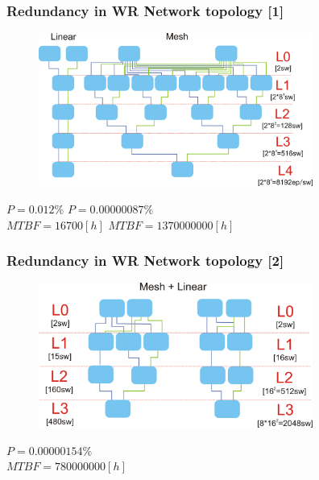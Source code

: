 \documentclass[]{beamer}
\begin{document}
\begin{frame}
  \frametitle{Redundancy in WR Network topology [1]}


\begin{figure}[tbp] %
  \centering
  \includegraphics[width=9cm,keepaspectratio]{network/network_topology_0.png}

\end{figure}

$P=0.012\%$  \hspace{4cm}   $P=0.00000087\%$  \\   
$MTBF=16700[h]$ \hspace{2cm} $MTBF=1370000000[h]$ 

\end{frame}

\begin{frame}
  \frametitle{Redundancy in WR Network topology [2]}



\begin{figure}[tbp] %
  \centering

  \includegraphics[width=9cm,keepaspectratio]{network/network_topology.png}

\end{figure}
\hspace{4cm}$P=0.00000154\%$    \\
\hspace{4cm}$MTBF=780000000[h]$ 

  \end{frame}
\end{document}
